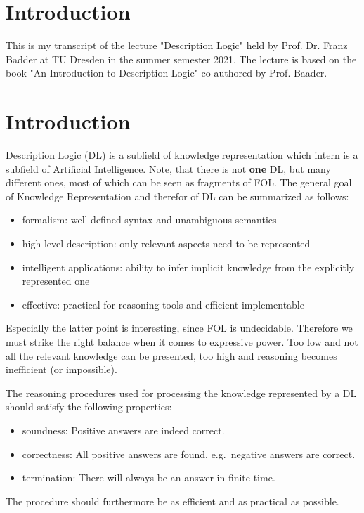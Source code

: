 \setcounter{chapter}{-1}
\chapter{Introduction}
This is my transcript of the lecture "Description Logic" held by Prof. Dr. Franz Badder at TU Dresden in the summer semester 2021.
The lecture is based on the book "An Introduction to Description Logic" \cite{baader_dl_17} co-authored by Prof. Baader.

\chapter{Introduction}
Description Logic (DL) is a subfield of knowledge representation which intern is a subfield of Artificial Intelligence.
Note, that there is not \textbf{one} DL, but many different ones, most of which can be seen as fragments of FOL.
The general goal of Knowledge Representation and therefor of DL can be summarized as follows:
\begin{itemize}
	\item formalism: well-defined syntax and unambiguous semantics
	\item high-level description: only relevant aspects need to be represented
	\item intelligent applications: ability to infer implicit knowledge from the explicitly represented one
	\item effective: practical for reasoning tools and efficient implementable
\end{itemize}
Especially the latter point is interesting, since FOL is undecidable.
Therefore we must strike the right balance when it comes to expressive power.
Too low and not all the relevant knowledge can be presented, too high and reasoning becomes inefficient (or impossible).

The reasoning procedures used for processing the knowledge represented by a DL should satisfy the following properties:
\begin{itemize}
	\item soundness: Positive answers are indeed correct. 
	\item correctness: All positive answers are found, e.g.\ negative answers are correct.
	\item termination: There will always be an answer in finite time.
\end{itemize}
The procedure should furthermore be as efficient and as practical as possible.

